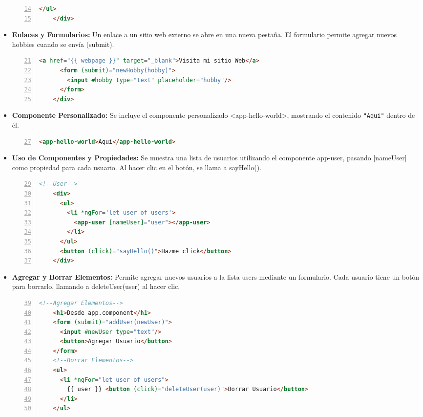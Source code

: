 \documentclass{article}
\begin{document}
\begin{itemize}
\begin{lstlisting}[language=html, numbers=left, firstnumber=14, numberstyle=\color{orange}]
      </ul>
    </div>
    \end{lstlisting}
    \item \textbf{Enlaces y Formularios: }Un enlace a un sitio web externo se abre en una nueva pestaña. 
    El formulario permite agregar nuevos hobbies cuando se envía (submit).
    \begin{lstlisting}[language=html, numbers=left, firstnumber=21, numberstyle=\color{orange}]
      <a href="{{ webpage }}" target="_blank">Visita mi sitio Web</a>
      <form (submit)="newHobby(hobby)">
        <input #hobby type="text" placeholder="hobby"/>
      </form>
    </div>
    \end{lstlisting}
    \item \textbf{Componente Personalizado: }Se incluye el componente personalizado <app-hello-world>, 
    mostrando el contenido \verb|"Aqui"| dentro de él.
    \begin{lstlisting}[language=html, numbers=left, firstnumber=27, numberstyle=\color{orange}]
    <app-hello-world>Aqui</app-hello-world>
    \end{lstlisting}
    \item \textbf{Uso de Componentes y Propiedades: }Se muestra una lista de usuarios utilizando el componente app-user, 
    pasando [nameUser] como propiedad para cada usuario. Al hacer clic en el botón, se llama a sayHello().
    \begin{lstlisting}[language=html, numbers=left, firstnumber=29, numberstyle=\color{orange}]
    <!--User-->
    <div>
      <ul>
        <li *ngFor='let user of users'>
          <app-user [nameUser]="user"></app-user>
        </li>
      </ul>
      <button (click)="sayHello()">Hazme click</button>
    </div>
    \end{lstlisting}
    \item \textbf{Agregar y Borrar Elementos: }Permite agregar nuevos usuarios a la lista users mediante un formulario. 
    Cada usuario tiene un botón para borrarlo, llamando a deleteUser(user) al hacer clic.
    \begin{lstlisting}[language=html, numbers=left, firstnumber=39, numberstyle=\color{orange}]
    <!--Agregar Elementos-->
    <h1>Desde app.component</h1>
    <form (submit)="addUser(newUser)">
      <input #newUser type="text"/>
      <button>Agregar Usuario</button>
    </form>
    <!--Borrar Elementos-->
    <ul>
      <li *ngFor="let user of users">
        {{ user }} <button (click)="deleteUser(user)">Borrar Usuario</button>
      </li>
    </ul>
    \end{lstlisting}
  \end{itemize}
  
\end{document}
